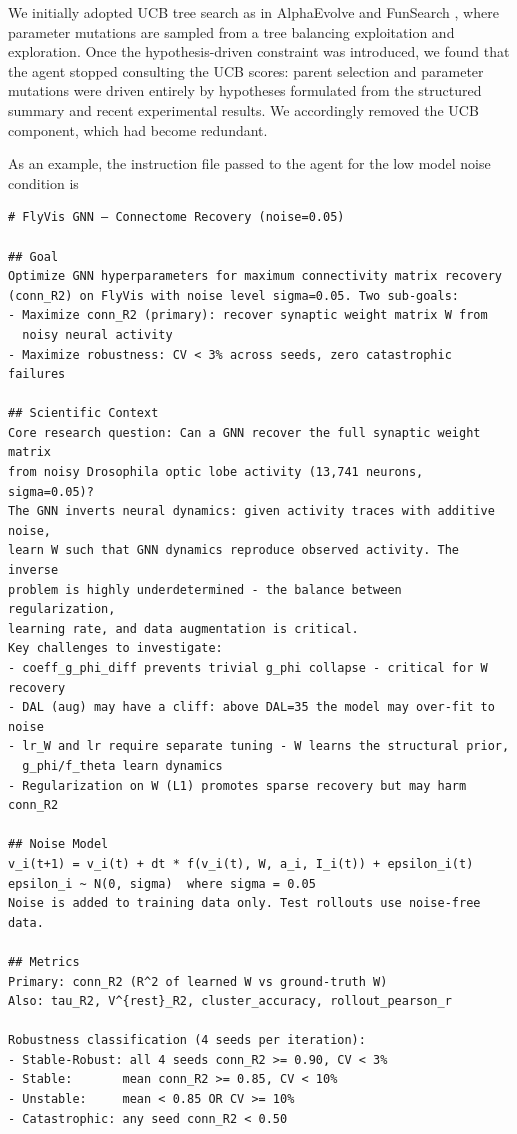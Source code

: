 \documentclass{article}
\begin{document}
We initially adopted UCB tree search as in AlphaEvolve and FunSearch
\citep{romera-paredes_mathematical_2024,novikov_alphaevolve_2025}, where
parameter mutations are sampled from a tree balancing exploitation and
exploration. Once the hypothesis-driven constraint was introduced, we
found that the agent stopped consulting the UCB scores: parent selection and
parameter mutations were driven entirely by hypotheses formulated from the
structured summary and recent experimental results. We accordingly removed
the UCB component, which had become redundant.


\label{app:instruction_file}

As an example, the instruction file passed to the agent for the low model noise condition is 

\begin{tiny}
\begin{verbatim}
# FlyVis GNN — Connectome Recovery (noise=0.05)

## Goal
Optimize GNN hyperparameters for maximum connectivity matrix recovery
(conn_R2) on FlyVis with noise level sigma=0.05. Two sub-goals:
- Maximize conn_R2 (primary): recover synaptic weight matrix W from
  noisy neural activity
- Maximize robustness: CV < 3% across seeds, zero catastrophic failures

## Scientific Context
Core research question: Can a GNN recover the full synaptic weight matrix
from noisy Drosophila optic lobe activity (13,741 neurons, sigma=0.05)?
The GNN inverts neural dynamics: given activity traces with additive noise,
learn W such that GNN dynamics reproduce observed activity. The inverse
problem is highly underdetermined - the balance between regularization,
learning rate, and data augmentation is critical.
Key challenges to investigate:
- coeff_g_phi_diff prevents trivial g_phi collapse - critical for W recovery
- DAL (aug) may have a cliff: above DAL=35 the model may over-fit to noise
- lr_W and lr require separate tuning - W learns the structural prior,
  g_phi/f_theta learn dynamics
- Regularization on W (L1) promotes sparse recovery but may harm conn_R2

## Noise Model
v_i(t+1) = v_i(t) + dt * f(v_i(t), W, a_i, I_i(t)) + epsilon_i(t)
epsilon_i ~ N(0, sigma)  where sigma = 0.05
Noise is added to training data only. Test rollouts use noise-free data.

## Metrics
Primary: conn_R2 (R^2 of learned W vs ground-truth W)
Also: tau_R2, V^{rest}_R2, cluster_accuracy, rollout_pearson_r

Robustness classification (4 seeds per iteration):
- Stable-Robust: all 4 seeds conn_R2 >= 0.90, CV < 3%
- Stable:       mean conn_R2 >= 0.85, CV < 10%
- Unstable:     mean < 0.85 OR CV >= 10%
- Catastrophic: any seed conn_R2 < 0.50


\end{verbatim}
\end{tiny}
\end{document}
